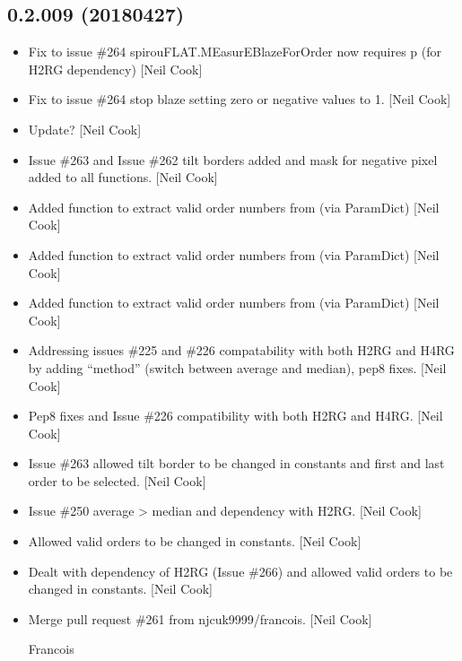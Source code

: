\documentclass[a4paper,10pt,english]{report}
\begin{document}
\subsection{0.2.009 (2018\sphinxhyphen{}04\sphinxhyphen{}27)}
\label{\detokenize{misc/changelog:id468}}\begin{itemize}
\item {} 
Fix to issue \#264 \sphinxhyphen{} spirouFLAT.MEasurEBlazeForOrder now requires p
(for H2RG dependency) {[}Neil Cook{]}

\item {} 
Fix to issue \#264 \sphinxhyphen{} stop blaze setting zero or negative values to 1.
{[}Neil Cook{]}

\item {} 
Update? {[}Neil Cook{]}

\item {} 
Issue \#263 and Issue \#262 \sphinxhyphen{} tilt borders added and mask for negative
pixel added to all functions. {[}Neil Cook{]}

\item {} 
Added function to extract valid order numbers from 
(via ParamDict) {[}Neil Cook{]}

\item {} 
Added function to extract valid order numbers from 
(via ParamDict) {[}Neil Cook{]}

\item {} 
Added function to extract valid order numbers from 
(via ParamDict) {[}Neil Cook{]}

\item {} 
Addressing issues \#225 and \#226 \sphinxhyphen{} compatability with both H2RG and
H4RG by adding “method” (switch between average and median), pep8
fixes. {[}Neil Cook{]}

\item {} 
Pep8 fixes and Issue \#226 \sphinxhyphen{} compatibility with both H2RG and H4RG.
{[}Neil Cook{]}

\item {} 
Issue \#263 \sphinxhyphen{} allowed tilt border to be changed in constants and first
and last order to be selected. {[}Neil Cook{]}

\item {} 
Issue \#250 \sphinxhyphen{} average \textendash{}\textgreater{} median and dependency with H2RG. {[}Neil Cook{]}

\item {} 
Allowed valid orders to be changed in constants. {[}Neil Cook{]}

\item {} 
Dealt with dependency of H2RG (Issue \#266) and allowed valid orders to
be changed in constants. {[}Neil Cook{]}

\item {} 
Merge pull request \#261 from njcuk9999/francois. {[}Neil Cook{]}

Francois

\end{itemize}
\end{document}
